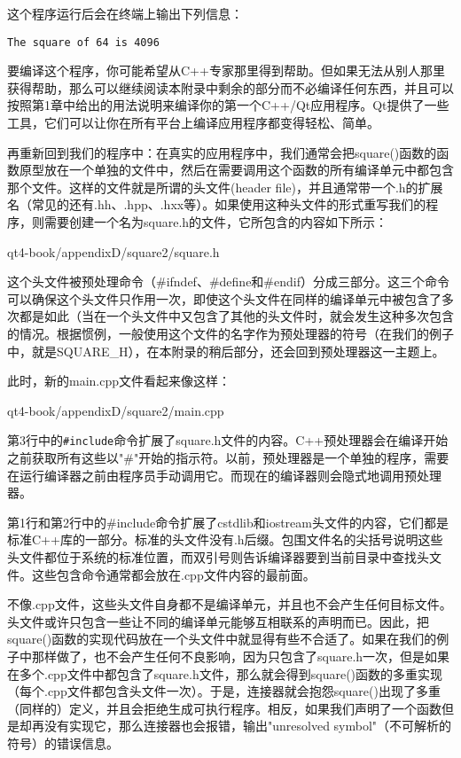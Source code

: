 \documentclass[11pt,oneside]{book}
\begin{document}
\begin{common-format}
这个程序运行后会在终端上输出下列信息：
\begin{Verbatim}
The square of 64 is 4096
\end{Verbatim}

要编译这个程序，你可能希望从C++专家那里得到帮助。但如果无法从别人那里获得帮助，那么可以继续阅读本附录中剩余的部分而不必编译任何东西，并且可以按照第1章中给出的用法说明来编译你的第一个C++/Qt应用程序。Qt提供了一些工具，它们可以让你在所有平台上编译应用程序都变得轻松、简单。

再重新回到我们的程序中：在真实的应用程序中，我们通常会把square()函数的函数原型放在一个单独的文件中，然后在需要调用这个函数的所有编译单元中都包含那个文件。这样的文件就是所谓的头文件(header file)，并且通常带一个.h的扩展名（常见的还有.hh、.hpp、.hxx等）。如果使用这种头文件的形式重写我们的程序，则需要创建一个名为square.h的文件，它所包含的内容如下所示：

\begin{cppinput}{qt4-book/appendixD/square2/square.h}
\end{cppinput}

这个头文件被预处理命令（\#{}ifndef、\#{}define和\#{}endif）分成三部分。这三个命令可以确保这个头文件只作用一次，即使这个头文件在同样的编译单元中被包含了多次都是如此（当在一个头文件中又包含了其他的头文件时，就会发生这种多次包含的情况。根据惯例，一般使用这个文件的名字作为预处理器的符号（在我们的例子中，就是SQUARE\_{}H），在本附录的稍后部分，还会回到预处理器这一主题上。

此时，新的main.cpp文件看起来像这样：
\begin{cppinput}{qt4-book/appendixD/square2/main.cpp}
\end{cppinput}

第3行中的\verb+#include+命令扩展了square.h文件的内容。C++预处理器会在编译开始之前获取所有这些以"\#{}"开始的指示符。以前，预处理器是一个单独的程序，需要在运行编译器之前由程序员手动调用它。而现在的编译器则会隐式地调用预处理器。

第1行和第2行中的\#{}include命令扩展了cstdlib和iostream头文件的内容，它们都是标准C++库的一部分。标准的头文件没有.h后缀。包围文件名的尖括号说明这些头文件都位于系统的标准位置，而双引号则告诉编译器要到当前目录中查找头文件。这些包含命令通常都会放在.cpp文件内容的最前面。

不像.cpp文件，这些头文件自身都不是编译单元，并且也不会产生任何目标文件。头文件或许只包含一些让不同的编译单元能够互相联系的声明而已。因此，把square()函数的实现代码放在一个头文件中就显得有些不合适了。如果在我们的例子中那样做了，也不会产生任何不良影响，因为只包含了square.h一次，但是如果在多个.cpp文件中都包含了square.h文件，那么就会得到square()函数的多重实现（每个.cpp文件都包含头文件一次）。于是，连接器就会抱怨square()出现了多重（同样的）定义，并且会拒绝生成可执行程序。相反，如果我们声明了一个函数但是却再没有实现它，那么连接器也会报错，输出"unresolved symbol"（不可解析的符号）的错误信息。


\end{common-format}
\end{document}
